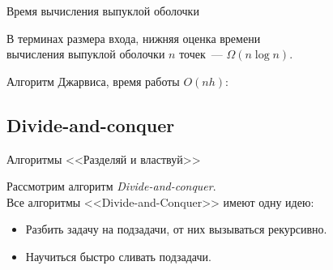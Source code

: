 \begin{frame}{Время вычисления выпуклой оболочки}
\begin{thm}
  В терминах размера входа, нижняя оценка времени \\
  вычисления выпуклой оболочки \(n\) точек~— \(\Omega (n \log n)\).
\end{thm}

Алгоритм Джарвиса, время работы \(O (nh)\):
\begin{center}  \end{center} \vspace{-1cm}
\end{frame}


\subsection{Divide-and-conquer}

    \begin{frame}{Алгоритмы <<Разделяй и властвуй>>}

        Рассмотрим алгоритм {\it Divide-and-conquer}. \\

        Все алгоритмы <<Divide-and-Conquer>> имеют одну идею:

        \begin{itemize}

            \item Разбить задачу на подзадачи, от них вызываться рекурсивно.

            \item Научиться быстро сливать подзадачи.

        \end{itemize}

    \end{frame}

